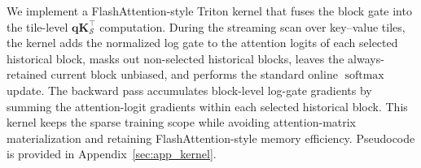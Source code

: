We implement a FlashAttention-style Triton \cite{tillet2019triton} kernel that fuses the block gate into the tile-level $\mathbf{q}\mathbf{K}_{\mathcal{S}}^\top$ computation.
During the streaming scan over key--value tiles, the kernel adds the normalized log gate to the attention logits of each selected historical block, masks out non-selected historical blocks, leaves the always-retained current block unbiased, and performs the standard online $\operatorname{softmax}$ update.
The backward pass accumulates block-level log-gate gradients by summing the attention-logit gradients within each selected historical block.
This kernel keeps the sparse training scope while avoiding attention-matrix materialization and retaining FlashAttention-style memory efficiency. Pseudocode is provided in Appendix~\ref{sec:app_kernel}.
